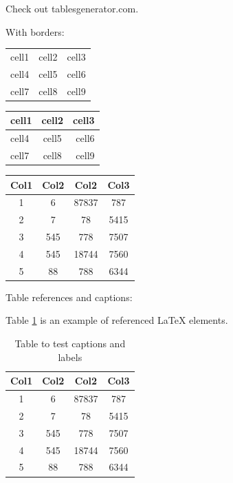 \documentclass[11pt, letterpaper]{article}
\begin{document}
Check out tablesgenerator.com.

With borders:

\begin{center}
\begin{tabular}{ |c|c|c| } 
 \hline
 cell1 & cell2 & cell3 \\ 
 cell4 & cell5 & cell6 \\ 
 cell7 & cell8 & cell9 \\ 
 \hline
\end{tabular}
\end{center}

\begin{center}
\begin{tabular}{ |l||c|||r| } 
 \hline
 cell1 & cell2 & cell3 \\ 
 \hline
 cell4 & cell5 & cell6 \\ 
 \hline
 \hline
 cell7 & cell8 & cell9 \\ 
 \hline
 \hline
 \hline
\end{tabular}
\end{center}

\begin{center}
 \begin{tabular}{||c c c c||} 
 \hline
 Col1 & Col2 & Col2 & Col3 \\ [0.5ex] 
 \hline\hline
 1 & 6 & 87837 & 787 \\ 
 \hline
 2 & 7 & 78 & 5415 \\
 \hline
 3 & 545 & 778 & 7507 \\
 \hline
 4 & 545 & 18744 & 7560 \\
 \hline
 5 & 88 & 788 & 6344 \\ [1ex] 
 \hline
\end{tabular}
\end{center}

Table references and captions:

Table \ref{table:data} is an example of referenced \LaTeX{} elements.
 
\begin{table}[h!]
\centering
\begin{tabular}{||c c c c||} 
 \hline
 Col1 & Col2 & Col2 & Col3 \\ [0.5ex] 
 \hline\hline
 1 & 6 & 87837 & 787 \\ 
 2 & 7 & 78 & 5415 \\
 3 & 545 & 778 & 7507 \\
 4 & 545 & 18744 & 7560 \\
 5 & 88 & 788 & 6344 \\ [1ex] 
 \hline
\end{tabular}
\caption{Table to test captions and labels}
\label{table:data}
\end{table}
\end{document}
